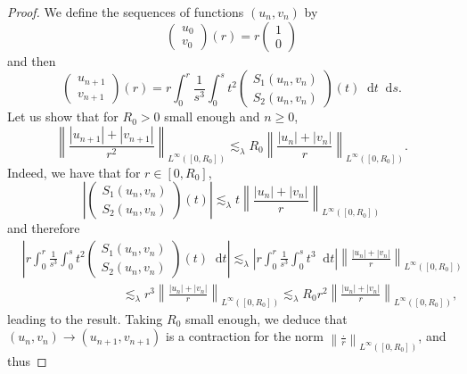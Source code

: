 \documentclass[11 pt]{amsart}
\theoremstyle{definition}
\theoremstyle{remark}
\numberwithin{equation}{section}
\newcommand{\dd}{\mathop{}\!\mathrm{d}}
\begin{document}
\begin{proof}
  We define the sequences of functions $(u_n, v_n)$ by
  \[ \left(\begin{array}{c}
       u_0\\
       v_0
     \end{array}\right) (r) = r \left(\begin{array}{c}
       1\\
       0
     \end{array}\right) \]
  and then
  \[ \left(\begin{array}{c}
       u_{n + 1}\\
       v_{n + 1}
     \end{array}\right) (r) = r \int_0^r \frac{1}{s^3} \int_0^s t^2
     \left(\begin{array}{c}
       S_1 (u_n, v_n)\\
       S_2 (u_n, v_n)
     \end{array}\right) (t) \dd t \dd s. \]
  Let us show that for $R_0 > 0$ small enough and $n \geqslant 0$,
  \[ \left\| \frac{| u_{n + 1} | + | v_{n + 1} |}{r^2} \right\|_{L^{\infty}
     ([0, R_0])} \lesssim_{\lambda} R_0 \left\| \frac{| u_n | + | v_n |}{r}
     \right\|_{L^{\infty} ([0, R_0])} . \]
  Indeed, we have that for $r \in [0, R_0]$,
  \[ \left| \left(\begin{array}{c}
       S_1 (u_n, v_n)\\
       S_2 (u_n, v_n)
     \end{array}\right) (t) \right| \lesssim_{\lambda} t \left\| \frac{| u_n |
     + | v_n |}{r} \right\|_{L^{\infty} ([0, R_0])} \]
  and therefore
\begin{align*}
& \left| r \int_0^r \frac{1}{s^3} \int_0^s t^2 \left(\begin{array}{c}
      S_1 (u_n, v_n)\\
      S_2 (u_n, v_n)
    \end{array}\right) (t)\dd t  \right| \lesssim_{\lambda} \left| r \int_0^r \frac{1}{s^3} \int_0^s t^3\dd t 
    \right| \left\| \frac{| u_n | + | v_n |}{r} \right\|_{L^{\infty} ([0,
    R_0])}\\
    & \qquad \qquad \qquad \qquad \lesssim_{\lambda} r^3 \left\| \frac{| u_n | + | v_n |}{r}
    \right\|_{L^{\infty} ([0, R_0])}  \lesssim_{\lambda} R_0 r^2 \left\| \frac{| u_n | + | v_n |}{r}
    \right\|_{L^{\infty} ([0, R_0])},
  \end{align*}
  leading to the result. Taking $R_0$ small enough, we deduce that $(u_n, v_n)
  \rightarrow (u_{n + 1}, v_{n + 1})$ is a contraction for the norm $\left\|
  \frac{.}{r} \right\|_{L^{\infty} ([0, R_0])}$, and thus

\end{proof}
\end{document}
